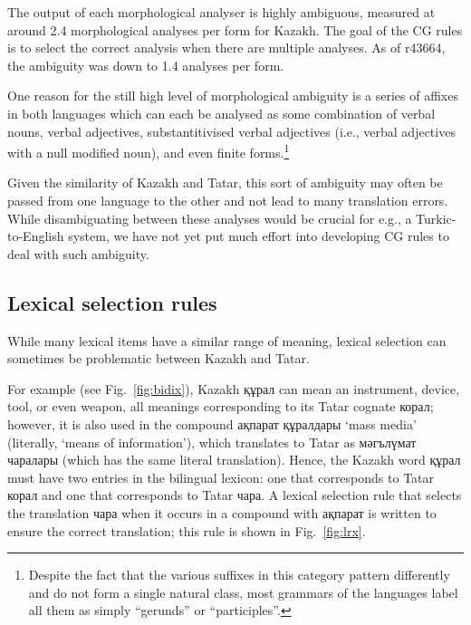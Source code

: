 \documentclass[a4paper,11pt]{article}
\newcommand{\eng}[1]{`#1'}
\begin{document}
The output of each morphological analyser is highly ambiguous, measured at around 2.4 morphological analyses per form for Kazakh.  The goal of the CG rules is to select the correct analysis when there are multiple analyses.  As of r43664, the ambiguity was down to 1.4 analyses per form.

One reason for the still high level of morphological ambiguity is a series of affixes in both languages which can each be analysed as some combination of verbal nouns, verbal adjectives, substantitivised verbal adjectives (i.e., verbal adjectives with a null modified noun), and even finite forms.\footnote{Despite the fact that the various suffixes in this category pattern differently and do not form a single natural class, most grammars of the languages label all them as simply ``gerunds'' or ``participles''.}

Given the similarity of Kazakh and Tatar, this sort of ambiguity may often be passed from one language to the other and not lead to many translation errors.  While disambiguating between these analyses would be crucial for e.g., a Turkic-to-English system, we have not yet put much effort into developing CG rules to deal with such ambiguity.

  

\subsection{Lexical selection rules}

While many lexical items have a similar range of meaning, lexical selection can sometimes be problematic between Kazakh and Tatar.

For example (see Fig.~\ref{fig:bidix}), Kazakh құрал can mean an instrument, device, tool, or even weapon, all 
meanings corresponding to its Tatar cognate корал; however, it is also used in the 
compound ақпарат құралдары \eng{mass media} (literally, \eng{means of information}), which translates 
to Tatar as мәгълүмат чаралары (which has the same literal translation).  Hence, the Kazakh word құрал must have 
two entries in the bilingual lexicon: one that corresponds to Tatar корал and one that corresponds 
to Tatar чара.  A lexical selection rule that selects the translation чара when it occurs in a compound with ақпарат is written to ensure the correct translation; this rule is shown in Fig.~\ref{fig:lrx}.
\end{document}
